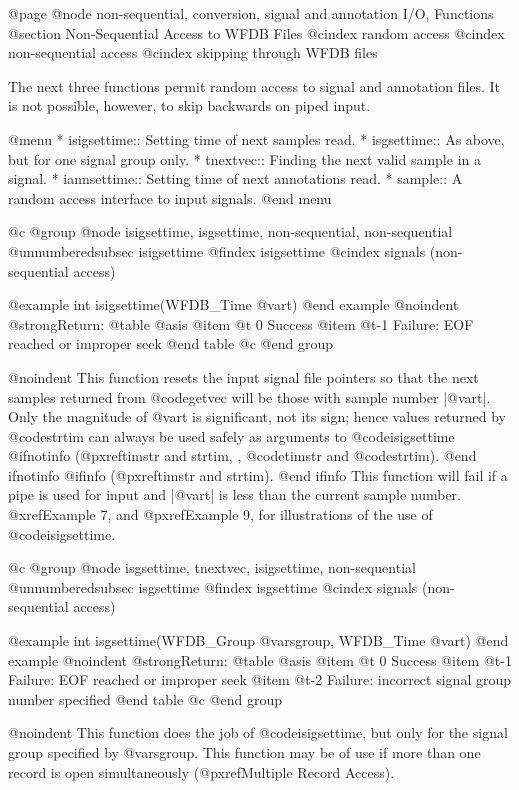 {{{{{{{{@page
@node     non-sequential, conversion, signal and annotation I/O, Functions
@section Non-Sequential Access to WFDB Files
@cindex random access
@cindex non-sequential access
@cindex skipping through WFDB files

The next three functions permit random access to signal and annotation
files.  It is not possible, however, to skip backwards on piped
input.

@menu
* isigsettime::			Setting time of next samples read.
* isgsettime::			As above, but for one signal group only.
* tnextvec::                    Finding the next valid sample in a signal.
* iannsettime::			Setting time of next annotations read.
* sample::			A random access interface to input signals.
@end menu

@c @group
@node     isigsettime, isgsettime, non-sequential, non-sequential
@unnumberedsubsec isigsettime
@findex isigsettime
@cindex signals (non-sequential access)

@example
int isigsettime(WFDB_Time @var{t})
@end example
@noindent
@strong{Return:}
@table @asis
@item @t{ 0}
Success
@item @t{-1}
Failure: EOF reached or improper seek
@end table
@c @end group

@noindent
This function resets the input signal file pointers so that the next
samples returned from @code{getvec} will be those with sample number
|@var{t}|.  Only the magnitude of @var{t} is significant, not its sign;
hence values returned by @code{strtim} can always be used safely as
arguments to @code{isigsettime}
@ifnotinfo
(@pxref{timstr and strtim, , @code{timstr} and @code{strtim}}).
@end ifnotinfo
@ifinfo
(@pxref{timstr and strtim}).
@end ifinfo
This function will fail if a pipe is used for input and |@var{t}| is less
than the current sample number.  @xref{Example 7}, and @pxref{Example 9},
for illustrations of the use of @code{isigsettime}.

@c @group
@node     isgsettime, tnextvec, isigsettime, non-sequential
@unnumberedsubsec isgsettime
@findex isgsettime
@cindex signals (non-sequential access)

@example
int isgsettime(WFDB_Group @var{sgroup}, WFDB_Time @var{t})
@end example
@noindent
@strong{Return:}
@table @asis
@item @t{ 0}
Success
@item @t{-1}
Failure: EOF reached or improper seek
@item @t{-2}
Failure: incorrect signal group number specified
@end table
@c @end group

@noindent
This function does the job of @code{isigsettime}, but only for the signal
group specified by @var{sgroup}.  This function may be of use if more than
one record is open simultaneously (@pxref{Multiple Record Access}).

}}}}}}}}
